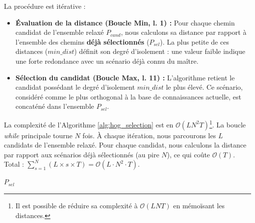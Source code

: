 \documentclass[11pt,a4paper]{article}
\begin{document}
La procédure est itérative :
\begin{itemize}
    \item \textbf{Évaluation de la distance (Boucle Min, l. 1) :} Pour chaque chemin candidat de l'ensemble relaxé $P_{cand}$, nous calculons sa distance par rapport à l'ensemble des chemins \textbf{déjà sélectionnés} ($P_{sel}$). La plus petite de ces distances ($min\_dist$) définit son degré d'isolement : une valeur faible indique une forte redondance avec un scénario déjà connu du maître.
    \item \textbf{Sélection du candidat (Boucle Max, l. 11) :} L'algorithme retient le candidat possédant le degré d'isolement $min\_dist$ le plus élevé. Ce scénario, considéré comme le plus orthogonal à la base de connaissances actuelle, est concaténé dans l'ensemble $P_{sel}$.
\end{itemize}

La complexité de l'Algorithme \ref{alg:hog_selection} est en $\mathcal{O}(LN^2T)$\footnote{Il est possible de réduire sa complexité à $\mathcal{O}(LNT)$ en mémoïsant les distances.}. La boucle \textit{while} principale tourne $N$ fois. À chaque itération, nous parcourons les $L$ candidats de l'ensemble relaxé. Pour chaque candidat, nous calculons la distance par rapport aux scénarios déjà sélectionnés (au pire $N$), ce qui coûte $\mathcal{O}(T)$. Total : $\sum_{s=1}^{N} (L \times s \times T) = \mathcal{O}(L \cdot N^2 \cdot T)$.

{\small
    \begin{algorithm}[H]
        \caption{MaxMin Selection (KCHOG)}
        \label{alg:hog_selection}
        
        
        
        \Return $P_{sel}$\;
    \end{algorithm}
}
\end{document}
